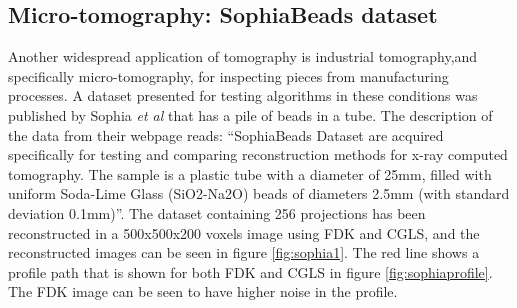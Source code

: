 \subsection{Micro-tomography: SophiaBeads dataset}
Another widespread application of tomography is industrial tomography,and specifically micro-tomography, for inspecting pieces from manufacturing processes. A dataset presented for testing algorithms in these conditions was published by Sophia \textit{et al}\cite{coban_2015_16539}\cite{coban2015sophiabeads} that has a pile of beads in a tube. The description of the data from their webpage\cite{coban_2015_16474} reads: ``SophiaBeads Dataset are acquired specifically for testing and comparing reconstruction methods for x-ray computed tomography. The sample is a plastic tube with a diameter of 25mm, filled with uniform Soda-Lime Glass (SiO2-Na2O) beads of diameters 2.5mm (with standard deviation 0.1mm)''. The dataset containing 256 projections has been reconstructed in a 500x500x200 voxels image using FDK and CGLS, and the reconstructed images can be seen in figure \ref{fig:sophia1}. The red line shows a profile path that is shown for both FDK and CGLS in figure \ref{fig:sophiaprofile}. The FDK image can be seen to have higher noise in the profile.

